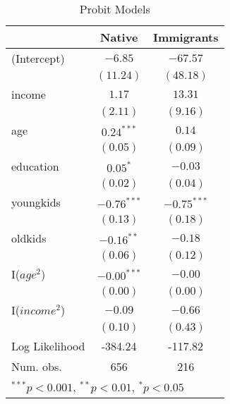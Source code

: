 
\begin{table}[hb!]
\footnotesize
\begin{center}
\begin{tabular}{l c c }
\toprule
 & Native & Immigrants \\
\midrule
(Intercept)    & $-6.85$       & $-67.57$      \\
               & $(11.24)$     & $(48.18)$     \\
income         & $1.17$        & $13.31$       \\
               & $(2.11)$      & $(9.16)$      \\
age            & $0.24^{***}$  & $0.14$        \\
               & $(0.05)$      & $(0.09)$      \\
education      & $0.05^{*}$    & $-0.03$       \\
               & $(0.02)$      & $(0.04)$      \\
youngkids      & $-0.76^{***}$ & $-0.75^{***}$ \\
               & $(0.13)$      & $(0.18)$      \\
oldkids        & $-0.16^{**}$  & $-0.18$       \\
               & $(0.06)$      & $(0.12)$      \\
I($age^2$)       & $-0.00^{***}$ & $-0.00$       \\
               & $(0.00)$      & $(0.00)$      \\
I($income^2$)    & $-0.09$       & $-0.66$       \\
               & $(0.10)$      & $(0.43)$      \\
\midrule
Log Likelihood & -384.24       & -117.82       \\
Num. obs.      & 656           & 216           \\
\bottomrule
\multicolumn{3}{l}{\scriptsize{$^{***}p<0.001$, $^{**}p<0.01$, $^*p<0.05$}}
\end{tabular}
\caption{Probit Models}
\label{table:coefficients}
\end{center}
\end{table}
